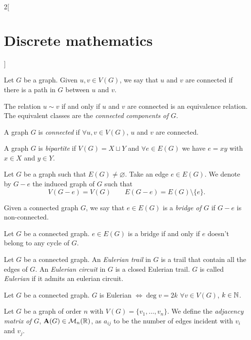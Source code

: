 \documentclass[../../../main.tex]{subfiles}
\begin{document}
\begin{multicols}{2}[\section{Discrete mathematics}]
\begin{prop}
    \end{prop}
    \begin{definition}
        Let $G$ be a graph. Given $u,v\in V(G)$, we say that $u$ and $v$ are connected if there is a path in $G$ between $u$ and $v$.
    \end{definition}
    \begin{prop}
        The relation $u\sim v$ if and only if $u$ and $v$ are connected is an equivalence relation. The equivalent classes are the \textit{connected components of $G$}.
    \end{prop}
    \begin{definition}
        A graph $G$ is \textit{connected} if $\forall u,v\in V(G)$, $u$ and $v$ are connected.
    \end{definition}
    \begin{definition}
        A graph $G$ is \textit{bipartite} if $V(G)=X\sqcup Y$ and $\forall e\in E(G)$ we have $e=xy$ with $x\in X$ and $y\in Y$.
    \end{definition}
    \begin{definition}
        Let $G$ be a graph such that $E(G)\ne\varnothing$. Take an edge $e\in E(G)$. We denote by $G-e$ the induced graph of $G$ such that $$V(G-e)=V(G)\qquad E(G-e)=E(G)\setminus\{e\}.$$
    \end{definition}
    \begin{definition}
        Given a connected graph $G$, we say that $e\in E(G)$ is a \textit{bridge of $G$} if $G-e$ is non-connected.
    \end{definition}
    \begin{prop}
        Let $G$ be a connected graph. $e\in E(G)$ is a bridge if and only if $e$ doesn't belong to any cycle of $G$.
    \end{prop}
    \begin{definition}
        Let $G$ be a connected graph. An \textit{Eulerian trail} in $G$ is a trail that contain all the edges of $G$. An \textit{Eulerian circuit} in $G$ is a closed Eulerian trail. $G$ is called \textit{Eulerian} if it admits an eulerian circuit.
    \end{definition}
    \begin{theorem}
        Let $G$ be a connected graph. $G$ is Eulerian $\iff\deg v=2k$ $\forall v\in V(G)$, $k\in\mathbb{N} $.
    \end{theorem}
    \begin{definition}
        Let $G$ be a graph of order $n$ with $V(G)=\{v_1,\ldots,v_n\}$. We define the \textit{adjacency matrix of $G$}, $\vb{A}(G)\in\mathcal{M}_n(\mathbb{R} )$, as $a_{ij}$ to be the number of edges incident with $v_i$ and $v_j$.

\end{definition}
\end{multicols}
\end{document}
